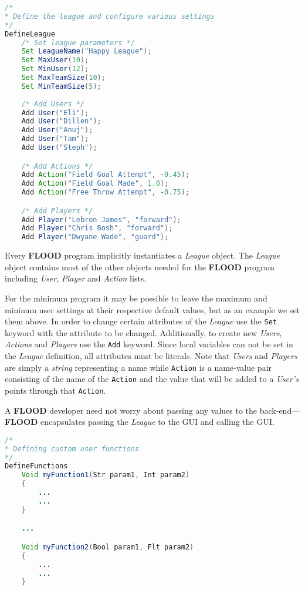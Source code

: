 \documentclass[12pt]{report}
\begin{document}
\begin{singlespace}
\begin{lstlisting}[language=Java,label=some-code,caption=Defining the league and setting parameters]
/*
* Define the league and configure various settings
*/
DefineLeague
	/* Set league parameters */
	Set LeagueName("Happy League");
	Set MaxUser(10);
	Set MinUser(12);
	Set MaxTeamSize(10);
	Set MinTeamSize(5);
	
	/* Add Users */
	Add User("Eli");
	Add User("Dillen");
	Add User("Anuj");
	Add User("Tam");
	Add User("Steph");

	/* Add Actions */
	Add Action("Field Goal Attempt", -0.45);
	Add Action("Field Goal Made", 1.0);
	Add Action("Free Throw Attempt", -0.75);

	/* Add Players */
	Add Player("Lebron James", "forward");
	Add Player("Chris Bosh", "forward");
	Add Player("Dwyane Wade", "guard");
\end{lstlisting}
\end{singlespace}

Every \textbf{FLOOD} program implicitly instantiates a \textit{League} object. The \textit{League} object contains most of the other objects needed for the \textbf{FLOOD} program including \textit{User}, \textit{Player} and \textit{Action} lists.

For the minimum program it may be possible to leave the maximum and mininum user settings at their respective default values, but as an example we set them above. In order to change certain attributes of the \textit{League} use the \texttt{Set} keyword with the attribute to be changed. Additionally, to create new \textit{Users}, \textit{Actions} and \textit{Players} use the \texttt{Add} keyword. Since local variables can not be set in the \textit{League} definition, all attributes must be literals. Note that \textit{Users} and \textit{Players} are simply a \textit{string} representing a name while \texttt{Action} is a name-value pair consisting of the name of the \texttt{Action} and the value that will be added to a \textit{User's} points through that \texttt{Action}.

A \textbf{FLOOD} developer need not worry about passing any values to the back-end---\textbf{FLOOD} encapsulates passing the \textit{League} to the GUI and calling the GUI.

\begin{singlespace}
\begin{lstlisting}[language=Java,label=some-code,caption=Defining functions]
/*
* Defining custom user functions
*/
DefineFunctions
	Void myFunction1(Str param1, Int param2)
	{
		...
		...
	}

	...

	Void myFunction2(Bool param1, Flt param2)
	{
		...
		...
	}
\end{lstlisting}
\end{singlespace}
\end{document}
